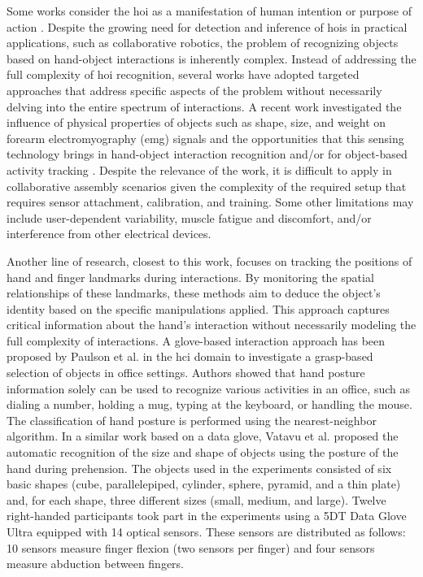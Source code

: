 Some works consider the \acs{hoi} as a manifestation of human intention or purpose of action \cite{Koppula2015,Hayes2017,Furnari2019,Xu2019,Roy2021}. Despite the growing need for detection and inference of \acs{hoi}s in practical applications, such as collaborative robotics, the problem of recognizing objects based on hand-object interactions is inherently complex. Instead of addressing the full complexity of \acs{hoi} recognition, several works have adopted targeted approaches that address specific aspects of the problem without necessarily delving into the entire spectrum of interactions. A recent work investigated the influence of physical properties of objects such as shape, size, and weight on forearm electromyography (\acs{emg}) signals and the opportunities that this sensing technology brings in hand-object interaction recognition and/or for object-based activity tracking \cite{Fan2018}. Despite the relevance of the work, it is difficult to apply in collaborative assembly scenarios given the complexity of the required setup that requires sensor attachment, calibration, and training. Some other limitations may include user-dependent variability, muscle fatigue and discomfort, and/or interference from other electrical devices.   

Another line of research, closest to this work, focuses on tracking the positions of hand and finger landmarks during interactions. By monitoring the spatial relationships of these landmarks, these methods aim to deduce the object's identity based on the specific manipulations applied. This approach captures critical information about the hand's interaction without necessarily modeling the full complexity of interactions. A glove-based interaction approach has been proposed by Paulson et al. \cite{Paulson2011} in the \acs{hci} domain to investigate a grasp-based selection of objects in office settings. Authors showed that hand posture information solely can be used to recognize various activities in an office, such as dialing a number, holding a mug, typing at the keyboard, or handling the mouse. The classification of hand posture is performed using the nearest-neighbor algorithm.  In a similar work based on a data glove, Vatavu et al. \cite{Vatavu2013} proposed the automatic recognition of the size and shape of objects using the posture of the hand during prehension. The objects used in the experiments consisted of six basic shapes (cube, parallelepiped, cylinder, sphere, pyramid, and a thin plate) and, for each shape, three different sizes (small, medium, and large). Twelve right-handed participants took part in the experiments using a 5DT Data Glove Ultra equipped with 14 optical sensors. These sensors are distributed as follows: 10 sensors measure finger flexion (two sensors per finger) and four sensors measure abduction between fingers. 

